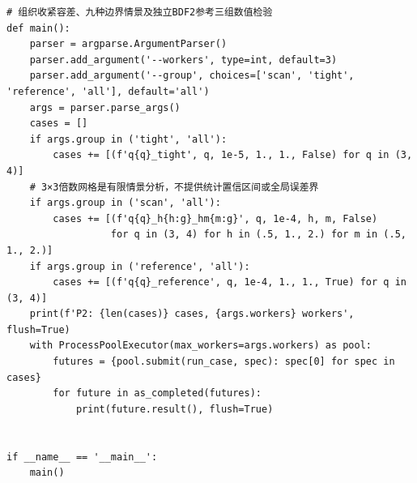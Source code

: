\begin{Verbatim}[fontsize=\scriptsize,breaklines=true,breakanywhere=true]
# 组织收紧容差、九种边界情景及独立BDF2参考三组数值检验
def main():
    parser = argparse.ArgumentParser()
    parser.add_argument('--workers', type=int, default=3)
    parser.add_argument('--group', choices=['scan', 'tight', 'reference', 'all'], default='all')
    args = parser.parse_args()
    cases = []
    if args.group in ('tight', 'all'):
        cases += [(f'q{q}_tight', q, 1e-5, 1., 1., False) for q in (3, 4)]
    # 3×3倍数网格是有限情景分析，不提供统计置信区间或全局误差界
    if args.group in ('scan', 'all'):
        cases += [(f'q{q}_h{h:g}_hm{m:g}', q, 1e-4, h, m, False)
                  for q in (3, 4) for h in (.5, 1., 2.) for m in (.5, 1., 2.)]
    if args.group in ('reference', 'all'):
        cases += [(f'q{q}_reference', q, 1e-4, 1., 1., True) for q in (3, 4)]
    print(f'P2: {len(cases)} cases, {args.workers} workers', flush=True)
    with ProcessPoolExecutor(max_workers=args.workers) as pool:
        futures = {pool.submit(run_case, spec): spec[0] for spec in cases}
        for future in as_completed(futures):
            print(future.result(), flush=True)


if __name__ == '__main__':
    main()
\end{Verbatim}

